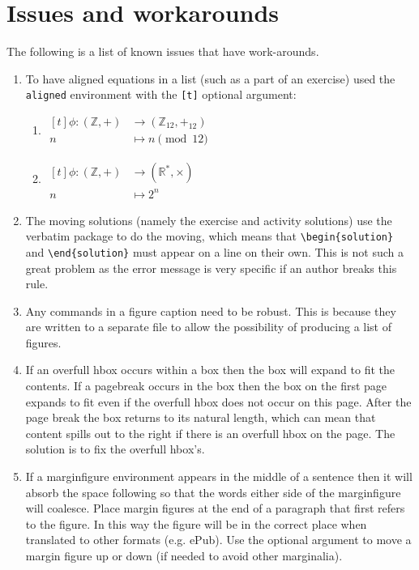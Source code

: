 \documentclass[solutionsatend,twocolumnsolutions]{ouunit}
\begin{document}
\section{Issues and workarounds}

The following is a list of known issues that have work-arounds.

\begin{enumerate}[1.]
\item
To have aligned equations in a list (such as a part of an exercise) used the \verb”aligned” environment with the \verb”[t]” optional argument:
\begin{enumerate}
\item \(\begin{aligned}[t]
\phi:(\mathbb{Z},+)&\longrightarrow (\mathbb{Z}_{12},+_{12})\\
  n&\longmapsto n\pmod{12}
  \end{aligned}\)
\item \(\begin{aligned}[t]
\phi:(\mathbb{Z},+)&\longrightarrow (\mathbb{R}^*,\times)\\
  n&\longmapsto 2^n
  \end{aligned}\)
\end{enumerate}
\item
The moving solutions (namely the exercise and activity solutions) use the verbatim package to do the moving, which means that \verb”\begin{solution}” and \verb”\end{solution}” must appear on a line on their own. This is not such a great problem as the error message is very specific if an author breaks this rule.
\item
Any commands in a figure caption need to be robust. This is because they are written to a separate file to allow the possibility of producing a list of figures.
\item
If an overfull hbox occurs within a box then the box will expand to fit the contents. If a pagebreak occurs in the box then the box on the first page expands to fit even if the overfull hbox does not occur on this page. After the page break the box returns to its natural length, which can mean that content spills out to the right if there is an overfull hbox on the page. The solution is to fix the overfull hbox's.
\item
If a marginfigure environment appears in the middle of a sentence then it will absorb the space following so that the words either side of the marginfigure will coalesce. Place margin figures at the end of a paragraph that first refers to the figure. In this way the figure will be in the correct place when translated to other formats (e.g. ePub). Use the optional argument to move a margin figure up or down (if needed to avoid other marginalia).

\end{enumerate}
\end{document}
